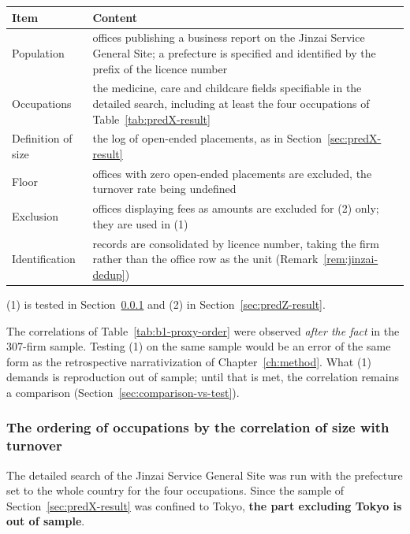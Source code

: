 \begin{center}
\begin{tabularx}{\textwidth}{@{}lX@{}}
\toprule
Item & Content \\
\midrule
Population & offices publishing a business report on the Jinzai Service General Site; a prefecture is specified and identified by the prefix of the licence number \\
Occupations & the medicine, care and childcare fields specifiable in the detailed search, including at least the four occupations of Table~\ref{tab:predX-result} \\
Definition of size & the log of open-ended placements, as in Section~\ref{sec:predX-result} \\
Floor & offices with zero open-ended placements are excluded, the turnover rate being undefined \\
Exclusion & offices displaying fees as amounts are excluded for (2) only; they are used in (1) \\
Identification & records are consolidated by licence number, taking the firm rather than the office row as the unit (Remark~\ref{rem:jinzai-dedup}) \\
\bottomrule
\end{tabularx}
\label{tab:predYZ-registration}
\end{center}

(1) is tested in Section~\ref{sec:predY-result} and (2) in Section~\ref{sec:predZ-result}.

\begin{remark}
\label{rem:no-same-sample-test}
The correlations of Table~\ref{tab:b1-proxy-order} were observed \emph{after the fact} in the
307-firm sample. Testing (1) on the same sample would be an error of the same form as the
retrospective narrativization of Chapter~\ref{ch:method}. What (1) demands is reproduction out of
sample; until that is met, the correlation remains a comparison
(Section~\ref{sec:comparison-vs-test}).
\end{remark}

\subsubsection{The ordering of occupations by the correlation of size with turnover}
\label{sec:predY-result}

The detailed search of the Jinzai Service General Site was run with the prefecture set to the
whole country for the four occupations. Since the sample of Section~\ref{sec:predX-result} was
confined to Tokyo, \textbf{the part excluding Tokyo is out of sample}.


